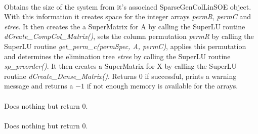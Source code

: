 \\
Obtains the size of the system from it's associaed SparseGenColLinSOE
object. With this information it creates space for the integer arrays
{\em permR}, {\em permC} and {\em etree}. It then creates the
a SuperMatrix for A by calling the SuperLU routine {\em
dCreate\_CompCol\_Matrix()}, sets the column permutation {\em permR}
by calling the SuperLU routine {\em get\_perm\_c(permSpec, A, permC)},
applies this permutation and determines the elimination tree {\em
etree} by calling the SuperLU routine {\em sp\_preorder()}. It then
creates a SuperMatrix for X by calling the SuperLU routine 
{\em dCreate\_Dense\_Matrix()}.
Returns $0$ if successful, prints a warning message and returns
a $-1$ if not enough memory is available for the arrays. \\


 \\ 
Does nothing but return $0$. \\

 \\ 
Does nothing but return $0$. \\








